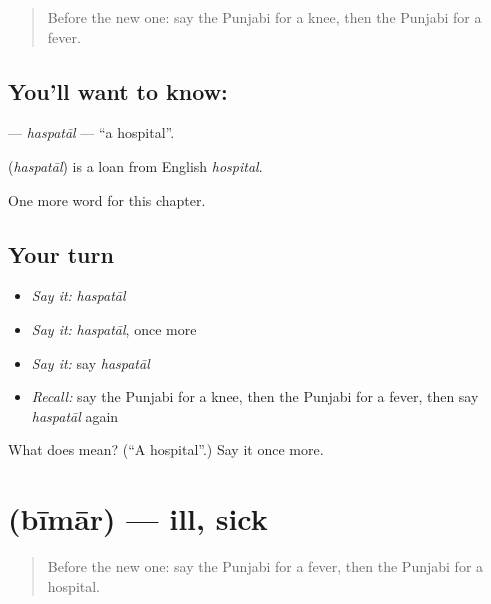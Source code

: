 \label{lesson:PA-C51-haspatal}



\begin{quote}
Before the new one: say the Punjabi for a knee, then the Punjabi for a fever.
\end{quote}

\subsection*{You'll want to know: }
\textbf{} — \emph{haspatāl} — \textquotedblleft{}a hospital\textquotedblright{}.

\begin{cousinweb}
\textbf{} (\emph{haspatāl}) is a loan from English \emph{hospital}.
\end{cousinweb}

\begin{grammarlens}[title={What you've built}]
One more word for this chapter.
\end{grammarlens}

\subsection*{Your turn}
\begin{itemize}
\raggedright
  \item \emph{Say it:} \emph{haspatāl}
  \item \emph{Say it:} \emph{haspatāl}, once more
  \item \emph{Say it:} say \emph{haspatāl}
  \item \emph{Recall:} say the Punjabi for a knee, then the Punjabi for a fever, then say \emph{haspatāl} again
\end{itemize}

\begin{tcolorbox}[breakable,colback=teal!4,colframe=teal!35!black,title={Before you move on}]
What does  mean? (\textquotedblleft{}A hospital\textquotedblright{}.) Say it once more.
\end{tcolorbox}
\section[\texorpdfstring{\pa{ਬੀਮਾਰ} (bīmār)}{ਬੀਮਾਰ (bīmār)}]{ (bīmār) — ill, sick}

\label{lesson:PA-C51-bimar}



\begin{quote}
Before the new one: say the Punjabi for a fever, then the Punjabi for a hospital.
\end{quote}

